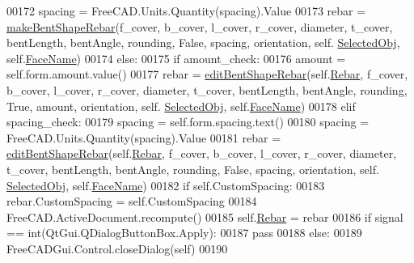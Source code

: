 \begin{DoxyCode}
00172                 spacing = FreeCAD.Units.Quantity(spacing).Value
00173                 rebar = \hyperlink{namespaceBentShapeRebar_aac46779d3e1905db5a3788917f6e2476}{makeBentShapeRebar}(f\_cover, b\_cover, l\_cover, r\_cover, diameter, 
      t\_cover, bentLength, bentAngle, rounding, \textcolor{keyword}{False}, spacing, orientation, self.
      \hyperlink{classBentShapeRebar_1_1__BentShapeRebarTaskPanel_a24d363ab6c058ce4436a2b29e9c0b279}{SelectedObj}, self.\hyperlink{classBentShapeRebar_1_1__BentShapeRebarTaskPanel_a499514a87885d4c9462e3c6dc314ec9c}{FaceName})
00174         \textcolor{keywordflow}{else}:
00175             \textcolor{keywordflow}{if} amount\_check:
00176                 amount = self.form.amount.value()
00177                 rebar = \hyperlink{namespaceBentShapeRebar_a941d005845cd497c0beb12bb8fef9171}{editBentShapeRebar}(self.\hyperlink{classBentShapeRebar_1_1__BentShapeRebarTaskPanel_aae8fd4e66d675c566d0afcee0af2341f}{Rebar}, f\_cover, b\_cover, l\_cover, 
      r\_cover, diameter, t\_cover, bentLength, bentAngle, rounding, \textcolor{keyword}{True}, amount, orientation, self.
      \hyperlink{classBentShapeRebar_1_1__BentShapeRebarTaskPanel_a24d363ab6c058ce4436a2b29e9c0b279}{SelectedObj}, self.\hyperlink{classBentShapeRebar_1_1__BentShapeRebarTaskPanel_a499514a87885d4c9462e3c6dc314ec9c}{FaceName})
00178             \textcolor{keywordflow}{elif} spacing\_check:
00179                 spacing = self.form.spacing.text()
00180                 spacing = FreeCAD.Units.Quantity(spacing).Value
00181                 rebar = \hyperlink{namespaceBentShapeRebar_a941d005845cd497c0beb12bb8fef9171}{editBentShapeRebar}(self.\hyperlink{classBentShapeRebar_1_1__BentShapeRebarTaskPanel_aae8fd4e66d675c566d0afcee0af2341f}{Rebar}, f\_cover, b\_cover, l\_cover, 
      r\_cover, diameter, t\_cover, bentLength, bentAngle, rounding, \textcolor{keyword}{False}, spacing, orientation, self.
      \hyperlink{classBentShapeRebar_1_1__BentShapeRebarTaskPanel_a24d363ab6c058ce4436a2b29e9c0b279}{SelectedObj}, self.\hyperlink{classBentShapeRebar_1_1__BentShapeRebarTaskPanel_a499514a87885d4c9462e3c6dc314ec9c}{FaceName})
00182         \textcolor{keywordflow}{if} self.CustomSpacing:
00183             rebar.CustomSpacing = self.CustomSpacing
00184             FreeCAD.ActiveDocument.recompute()
00185         self.\hyperlink{classBentShapeRebar_1_1__BentShapeRebarTaskPanel_aae8fd4e66d675c566d0afcee0af2341f}{Rebar} = rebar
00186         \textcolor{keywordflow}{if} signal == int(QtGui.QDialogButtonBox.Apply):
00187             \textcolor{keywordflow}{pass}
00188         \textcolor{keywordflow}{else}:
00189             FreeCADGui.Control.closeDialog(self)
00190 
\end{DoxyCode}


